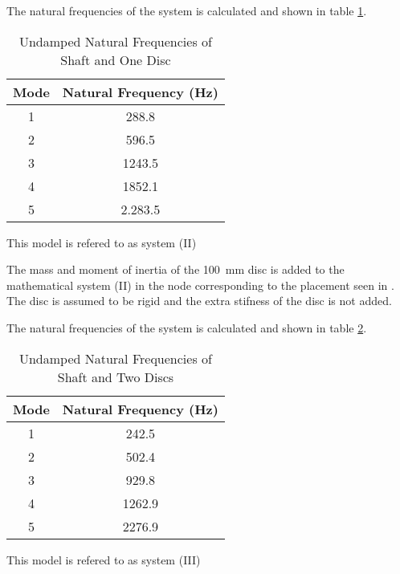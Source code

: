 The natural frequencies of the system is calculated and shown in table \ref{tab:natural_freq_one_disc}.
\begin{table}[htbp]
    \centering
    \caption{Undamped Natural Frequencies of Shaft and One Disc}
    \label{tab:natural_freq_one_disc}
    \begin{tabular}{@{}cc@{}}
        \toprule
        Mode    &   Natural Frequency (\si{\hertz})    \\ \midrule
        1       &   288.8   \\
        2       &   596.5   \\
        3       &   1243.5  \\
        4       &   1852.1  \\ 
        5       &   2.283.5 \\ \bottomrule
    \end{tabular}
\end{table}


This model is refered to as system (II)

The mass and moment of inertia of the \SI{100}{\milli \meter} disc is added to the mathematical system (II) in the node corresponding to the placement seen in \cite[Appendix]{Problem}.
The disc is assumed to be rigid and the extra stifness of the disc is not added.

The natural frequencies of the system is calculated and shown in table \ref{tab:natural_freq_two_discs}.
\begin{table}[htbp]
    \centering
    \caption{Undamped Natural Frequencies of Shaft and Two Discs}
    \label{tab:natural_freq_two_discs}
    \begin{tabular}{@{}cc@{}}
        \toprule
        Mode    &   Natural Frequency (\si{\hertz})    \\ \midrule
        1       &   242.5   \\
        2       &   502.4   \\
        3       &   929.8  \\
        4       &   1262.9  \\ 
        5       &   2276.9 \\ \bottomrule
    \end{tabular}
\end{table}

This model is refered to as system (III)

